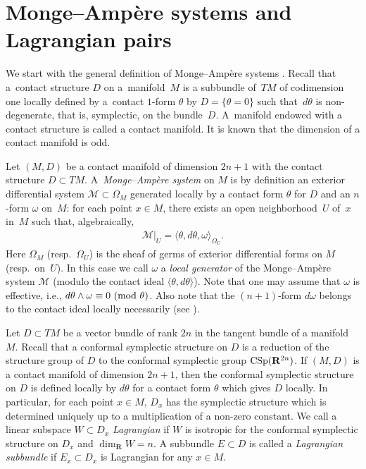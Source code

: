 \section[Monge-Amp{\`e}re systems and Lagrangian pairs]{Monge--Amp{\`e}re systems and Lagrangian pairs}
\label{Monge-Ampere systems and Lagrangian pairs}

We start with the general def\/inition of Monge--Amp{\`e}re systems
\cite{B-G-G,L, Mo1,Mo2}.
Recall that a~contact structure $D$ on a~mani\-fold~$M$
is a subbundle of~$TM$ of codimension one locally def\/ined by a~contact
$1$-form $\theta$ by $D = \{ \theta = 0\}$ such that~$d\theta$ is non-degenerate,
that is, symplectic, on the bundle~$D$.
A~manifold endowed with a contact structure is called a contact manifold.
It is known that the dimension of a contact manifold is odd.

Let $(M, D)$ be a contact manifold of dimension $2n+1$ with
the contact structure \mbox{$D \subset TM$}.
A~{\it Monge--Amp{\`e}re system}
on $M$ is by def\/inition an exterior dif\/ferential system ${\mathcal M} \subset \Omega_M$
ge\-ne\-rated locally by a contact form $\theta$ for $D$ and an
$n$-form $\omega$ on~$M$: for each point $x \in M$,
there exists an open neighborhood~$U$ of~$x$ in~$M$ such that,
algebraically,
\begin{gather*}
{\mathcal M}\vert_U =
\langle \theta, d\theta, \omega
\rangle_{\Omega_U}.
\end{gather*}
Here $\Omega_M$ (resp.\ $\Omega_U$)
is the sheaf of germs of
exterior dif\/ferential forms
on $M$ (resp.\ on~$U$). In this case we call
$\omega$ a {\it local generator} of the Monge--Amp{\`e}re system
${\mathcal M}$ (modulo the contact ideal $\langle \theta, d\theta \rangle$).
Note that one may assume that $\omega$ is ef\/fective, i.e.,
$d\theta \wedge \omega \equiv
0\ (\rm{mod}\ \theta)$.
Also note that the $(n+1)$-form
$d\omega$ belongs to the contact ideal locally necessarily (see \cite{B1,B2, L}).

Let $D \subset TM$ be a vector bundle of rank $2n$ in the tangent bundle of a manifold $M$.
Recall that a conformal symplectic structure on $D$ is a reduction of the structure group of $D$
to the conformal symplectic group ${\rm CSp}({\mathbf{R}}^{2n})$.
If $(M, D)$ is a contact manifold of dimension $2n+1$, then
the conformal symplectic structure on $D$ is def\/ined locally by $d\theta$ for a contact form
$\theta$ which gives $D$ locally.
In particular, for each point $x \in M$, $D_x$ has the symplectic structure which is determined uniquely up to
a multiplication of a non-zero constant.
We call a linear subspace $W \subset D_x$
{\it Lagrangian} if $W$ is isotropic for the conformal symplectic structure on $D_x$ and $\dim_{{\mathbf{R}}} W = n$.
A subbundle $E \subset D$ is called a {\it Lagrangian subbundle} if $E_x \subset D_x$ is Lagrangian for any $x \in M$.

